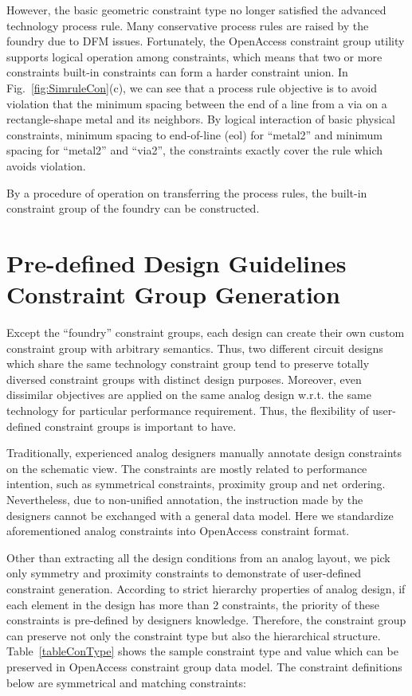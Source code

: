   However, the basic geometric constraint type no longer satisfied the advanced technology process rule. Many conservative process rules are raised by the foundry due to DFM issues. Fortunately, the OpenAccess constraint group utility supports logical operation among constraints, which means that two or more constraints built-in constraints can form a harder constraint union. In Fig.~\ref{fig:SimruleCon}(c), we can see that a process rule objective is to avoid violation that the minimum spacing between the end of a line from a via on a rectangle-shape metal and its neighbors. By logical interaction of basic physical constraints, minimum spacing to end-of-line (eol) for ``metal2'' and minimum spacing for ``metal2'' and ``via2'', the constraints exactly cover the rule which avoids violation.
  
  By a procedure of operation on transferring the process rules, the built-in constraint group of the foundry can be constructed.

  \section{Pre-defined Design Guidelines Constraint Group Generation}\label{sec:PreDesignCG}
    Except the ``foundry'' constraint groups, each design can create their own custom constraint group with arbitrary semantics. Thus, two different circuit designs which share the same technology constraint group tend to preserve totally diversed constraint groups with distinct design purposes. Moreover, even dissimilar objectives are applied on the same analog design w.r.t. the same technology for particular performance requirement. Thus, the flexibility of user-defined constraint groups is important to have. 

    Traditionally, experienced analog designers manually annotate design constraints on the schematic view. The constraints are mostly related to performance intention, such as symmetrical constraints, proximity group and net ordering. Nevertheless, due to non-unified annotation, the instruction made by the designers cannot be exchanged with a general data model. Here we standardize aforementioned analog constraints into OpenAccess constraint format. 
  
    Other than extracting all the design conditions from an analog layout, we pick only symmetry and proximity constraints to demonstrate of user-defined constraint generation. According to strict hierarchy properties of analog design, if each element in the design has more than 2 constraints, the priority of these constraints is pre-defined by designers knowledge. Therefore, the constraint group can preserve not only the constraint type but also the hierarchical structure. Table~\ref{tableConType} shows the sample constraint type and value which can be preserved in OpenAccess constraint group data model. The constraint definitions below are symmetrical and matching constraints: 


